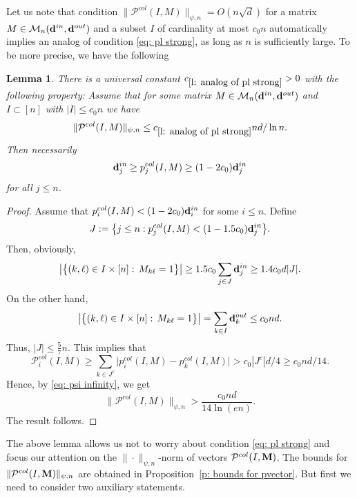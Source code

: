 \documentclass[12pt]{article}
\newtheorem{lemma}[theorem]{Lemma}
\theoremstyle{definition}
\theoremstyle{plain}
\def\ranmtx{{\bf{}M}}
\def\InDeg{{\bf d}^{in}}
\def\OutDeg{{\bf d}^{out}}
\def\MatrixSet{{\mathcal M}_n}
\def\pvector{{\mathcal P}}
\begin{document}
Let us note that condition $\|\pvector^{col}(I,M)\|_{\psi,n}=O(n\sqrt{d})$ for a matrix $M\in\MatrixSet(\InDeg,\OutDeg)$
and a subset $I$ of cardinality at most $c_0 n$ automatically implies an analog of condition \eqref{eq: pl strong},
as long as $n$ is sufficiently large. To be more precise, we have the following
\begin{lemma}\label{l: analog of pl strong}
There is a universal constant $c_{\ref{l: analog of pl strong}}>0$ with the following property:
Assume that for some matrix $M\in\MatrixSet(\InDeg,\OutDeg)$ and $I\subset[n]$ with $|I|\leq c_0 n$ we have
$$\|\pvector^{col}(I,M)\|_{\psi,n}\leq c_{\ref{l: analog of pl strong}}nd/\ln n.$$
Then necessarily
$$\InDeg_j\geq p_j^{col}(I,M)\geq (1-2c_0)\InDeg_j$$
for all $j\leq n$.
\end{lemma}
\begin{proof}
Assume that $p_i^{col}(I,M)<(1-2c_0)\InDeg_i$ for some $i\leq n$.
Define
$$J:=\big\{j\leq n: p_j^{col}(I,M)<(1-1.5c_0)\InDeg_j\big\}.$$
Then, obviously,
$$\big|\big\{(k,\ell)\in I\times [n]:\,M_{k\ell}=1\big\}\big|\geq 1.5c_0\sum_{j\in J}\InDeg_j\geq 1.4c_0d|J|.$$
On the other hand,
$$\big|\big\{(k,\ell)\in I\times [n]:\,M_{k\ell}=1\big\}\big|=\sum_{k\in I}\OutDeg_k\leq c_0 nd.$$
Thus, $|J|\leq \frac{5}{7}n$. This implies that
$$\pvector_i^{col}(I,M)\geq \sum_{k\in J^c} \big|p_i^{col}(I,M)-p_k^{col}(I,M)\big|> c_0|J^c|d/4\geq c_0nd/14.$$
Hence, by \eqref{eq: psi infinity}, we get
$$\|\pvector^{col}(I,M)\|_{\psi,n}> \frac{c_0 nd}{14\ln(en)}.$$
The result follows.
\end{proof}

The above lemma allows us not to worry about condition \eqref{eq: pl strong}
and focus our attention on the $\|\cdot\|_{\psi,n}$-norm of vectors $\pvector^{col}(I,\ranmtx)$.
The bounds for $\|\pvector^{col}(I,\ranmtx)\|_{\psi,n}$ are obtained in Proposition~\ref{p: bounds for pvector}.
But first we need to consider two auxiliary statements.
\end{document}
